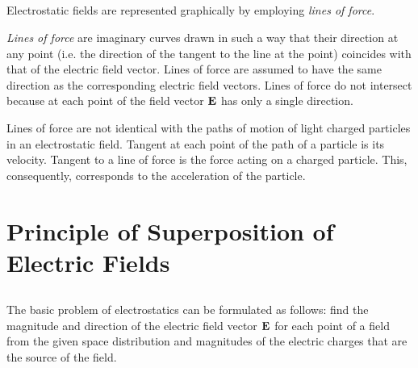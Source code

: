 \subsection{}\label{15.1.6} Electrostatic fields are represented graphically by employing \emph{lines of force}.

\emph{Lines of force} are imaginary curves drawn in such a way that their direction at any point (i.e. the direction of the tangent to the line at the point) coincides with that of the electric field vector. Lines of force are assumed to have the same direction as the corresponding electric field vectors. Lines of force do not intersect because at each point of the field vector $\vb{E}$  has only a single direction.

Lines of force are not identical with the paths of motion of light charged particles in an electrostatic field. Tangent at each point of the path of a particle is its velocity. Tangent to a line of force is the force acting on a charged particle. This, consequently, corresponds to the acceleration of the particle.

\section{Principle of Superposition of Electric Fields}
\label{sec-15.2}


\subsection{}\label{15.2.1} The basic problem of electrostatics can be formulated as follows: find the magnitude and direction of the electric field vector $\vb{E}$ for each point of a field from the given space distribution and magnitudes of the electric charges that are the source of the field.


